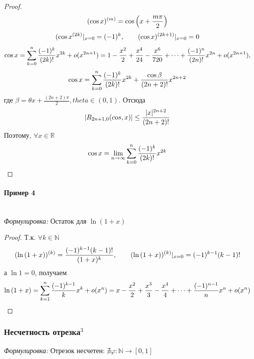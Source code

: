 \documentclass{article}
\let\vanillaparagraph\paragraph
\renewcommand{\paragraph}[1]{\vanillaparagraph{#1}\mbox{}\\}
\begin{document}
\begin{proof}
\begin{equation}
(\cos{x})^{(m)} = \cos{\left(x + \frac{m\pi} {2}\right)}\notag
\end{equation}
\begin{equation}
(\cos{x}^{(2k)}\arrowvert_{x=0} = (-1)^k, \qquad (\cos{x})^{(2k + 1)} \arrowvert_{x=0} = 0\notag
\end{equation}
\begin{equation}
\cos{x} = \sum_{k=0}^n \frac{(-1)^k} {(2k)!} x^{2k} + o(x^{2n+1}) = 1 - \frac{x^2} {2} + \frac {x^4} {24} - \frac{x^6} {720} + \dots + \frac{(-1)^n} {(2n)!} x^{2n} + o(x^{2n+1}),\notag
\end{equation}
\begin{equation}
\cos{x} = \sum_{k=0}^n \frac{(-1)^k} {(2k)!} x^{2k} + \frac {\cos{\beta}} {(2n+2)!} x^{2n+2}\notag
\end{equation}
где $\beta = \theta x + \frac{(2n+2)\pi} {2}, theta \in (0, 1)$. Отсюда
\begin{equation}
|R_{2n+1, 0} (cos, x)| \leq \frac{|x|^{2n+2}}{(2n+2)!}\notag
\end{equation}
Поэтому, $\forall x \in \mathbb{R}$
\begin{equation}
\cos{x} = \lim_{n \to\infty}\sum_{k=0}^n \frac{(-1)^k} {(2k)!} x^{2k}\notag
\end{equation}
\end{proof}

\paragraph{Пример 4}

\textit{Формулировка: }
Остаток для $\ln{\left(1 + x\right)}$

\begin{proof}
Т.к. $\forall k \in \mathbb{N}$
\begin{equation}
(\ln{\left(1 + x\right)})^{(k)} = \frac{(-1)^{k-1}(k-1)!}{(1+x)^k}, \qquad (\ln{\left(1 + x\right)})^{(k)}\arrowvert_{x=0} = (-1)^{k-1}(k-1)!\notag
\end{equation}
а $\ln{1} = 0$, получаем
\begin{equation}
\ln{\left(1 + x\right)} = \sum_{k=1}^n \frac{(-1)^{k-1}}{k} x^k + o(x^n) = x - \frac{x^2} {2} + \frac{x^3} {3} - \frac{x^4} {4} + \dots + \frac{(-1)^{n-1} }{n} x^n + o(x^n)\notag
\end{equation}
\end{proof}

\subsubsection{Несчетность отрезка\texorpdfstring{$^3$}{}}
\textit{Формулировка: }
Отрезок несчетен: $\nexists \varphi:\mathbb{N} \to [0, 1]$
\end{document}

